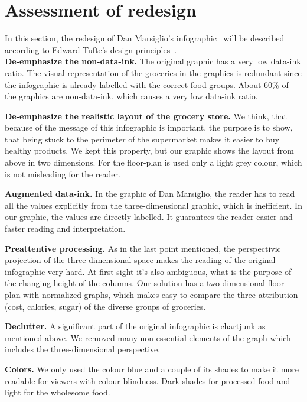 \section{Assessment of redesign}

In this section, the redesign of Dan Marsiglio's
infographic~\cite{DanMarsiglio2008} will be described according to Edward
Tufte's design principles~\cite{Tufte2001}.\\

\textbf{De-emphasize the non-data-ink.} The original graphic has a very low
data-ink ratio. The visual representation of the groceries in the graphics is
redundant since the infographic is already labelled with the correct food
groups. About 60\% of the graphics are non-data-ink, which causes a very low
data-ink ratio.

\textbf{De-emphasize the realistic layout of the grocery store.} We
think, that because of the message of this infographic is important. the
purpose is to show, that being stuck to the perimeter of the supermarket
makes it easier to buy healthy products. We kept this property, but our
graphic shows the layout from above in two dimensions. For the floor-plan is
used only a light grey colour, which is not misleading for the reader.

\textbf{Augmented data-ink.} In the graphic of Dan Marsiglio, the reader has to
read all the values explicitly from the three-dimensional graphic, which is
inefficient. In our graphic, the values are directly labelled. It guarantees the
reader easier and faster reading and interpretation.

\textbf{Preattentive processing.} As in the last point mentioned, the
perspectivic projection of the three dimensional space makes the reading of
the original infographic very hard. At first sight it's also ambiguous,
what is the purpose of the changing height of the columns. Our solution
has a two dimensional floor-plan with normalized graphs, which makes easy to
compare the three attribution (cost, calories, sugar) of the diverse groups of
groceries.

\textbf{Declutter.} A significant part of the original infographic is chartjunk
as mentioned above. We removed many non-essential elements of the graph which
includes the three-dimensional perspective. 

\textbf{Colors.} We only used the colour blue and a couple of its shades to make
it more readable for viewers with colour blindness. Dark shades for processed
food and light for the wholesome food.\\

